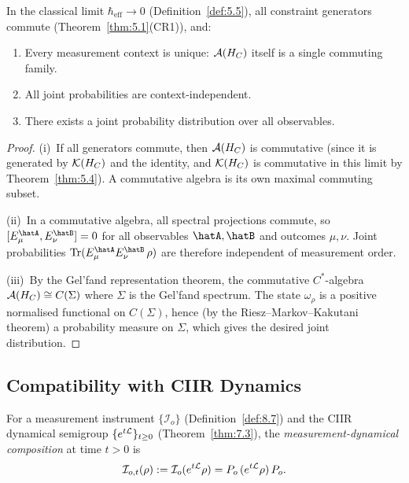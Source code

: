 \begin{proposition}
\label{prop:8.3}
In the classical limit $\hbar_{\mathrm{eff}} \to 0$
\textup{(}Definition~\textup{\ref{def:5.5})}, all constraint generators
commute \textup{(}Theorem~\textup{\ref{thm:5.1}(CR1))}, and:
\begin{enumerate}
  \item[\textup{(i)}] Every measurement context is unique: $\mathcal{A}(H_C)$
    itself is a single commuting family.
  \item[\textup{(ii)}] All joint probabilities are context-independent.
  \item[\textup{(iii)}] There exists a joint probability distribution
    over all observables.
\end{enumerate}
\end{proposition}

\begin{proof}
(i)~If all generators commute, then $\mathcal{A}(H_C)$ is commutative
(since it is generated by $\mathcal{K}(H_C)$ and the identity, and
$\mathcal{K}(H_C)$ is commutative in this limit by
Theorem~\ref{thm:5.4}).  A commutative algebra is its own maximal
commuting subset.

(ii)~In a commutative algebra, all spectral projections commute, so
$[E^{\hatA}_\mu, E^{\hatB}_\nu] = 0$ for all observables
$\hatA, \hatB$ and outcomes $\mu, \nu$.  Joint probabilities
$\Tr(E^{\hatA}_\mu E^{\hatB}_\nu\,\rho)$ are therefore independent of
measurement order.

(iii)~By the Gel'fand representation theorem, the commutative
$C^*$-algebra $\mathcal{A}(H_C) \cong C(\Sigma)$ where $\Sigma$ is the
Gel'fand spectrum.  The state $\omega_\rho$ is a positive normalised
functional on $C(\Sigma)$, hence (by the Riesz--Markov--Kakutani
theorem) a probability measure on $\Sigma$, which gives the desired
joint distribution.
\end{proof}

\subsection{Compatibility with CIIR Dynamics}
\label{sec:ch8:dynamics}

\begin{definition}
\label{def:8.17}
For a measurement instrument $\{\mathcal{I}_o\}$
(Definition~\ref{def:8.7}) and the CIIR dynamical semigroup
$\{e^{t\mathcal{L}}\}_{t \geq 0}$ (Theorem~\ref{thm:7.3}), the
\emph{measurement-dynamical composition} at time $t > 0$ is
\[
  \mathcal{I}_{o,t}(\rho) := \mathcal{I}_o(e^{t\mathcal{L}}\rho)
  = P_o\,(e^{t\mathcal{L}}\rho)\,P_o.
\]
\end{definition}

